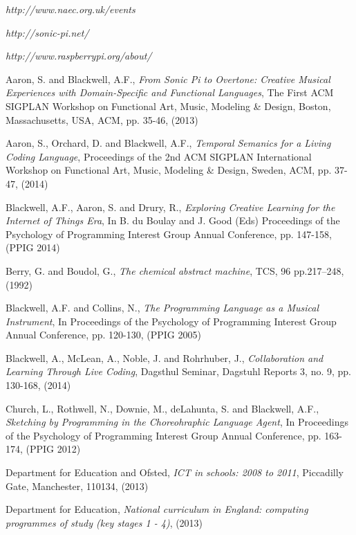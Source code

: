\documentclass[11pt]{scrartcl}
\begin{document}
\begin{thebibliography}{9}

  \emph{http://www.naec.org.uk/events}

  \emph{http://sonic-pi.net/}

  \emph{http://www.raspberrypi.org/about/}

  Aaron, S. and Blackwell, A.F.,
  \emph{From Sonic Pi to Overtone: Creative Musical Experiences with Domain-Specific and Functional Languages},
  The First ACM SIGPLAN Workshop on Functional Art, Music, Modeling \& Design,
  Boston, Massachusetts, USA,
  ACM, pp. 35-46,
  (2013)

  Aaron, S., Orchard, D. and Blackwell, A.F.,
  \emph{Temporal Semanics for a Living Coding Language},
  Proceedings of the 2nd ACM SIGPLAN International Workshop on Functional Art, Music, Modeling \& Design,
  Sweden, ACM, pp. 37-47,
  (2014)

  Blackwell, A.F., Aaron, S. and Drury, R., 
  \emph{Exploring Creative Learning for the Internet of Things Era},
  In B. du Boulay and J. Good (Eds) Proceedings of the Psychology of Programming Interest Group Annual Conference, 
  pp. 147-158,
  (PPIG 2014)

  Berry, G. and Boudol, G.,
  \emph{The chemical abstract machine},
  TCS, 96 pp.217–248, 
  (1992)

  Blackwell, A.F. and Collins, N.,
  \emph{The Programming Language as a Musical Instrument},
  In Proceedings of the Psychology of Programming Interest Group Annual Conference,
  pp. 120-130,
  (PPIG 2005)

  Blackwell, A., McLean, A., Noble, J. and Rohrhuber, J.,
  \emph{Collaboration and Learning Through Live Coding},
  Dagsthul Seminar, Dagstuhl Reports 3,
  no. 9, pp. 130-168,
  (2014)

  Church, L., Rothwell, N., Downie, M., deLahunta, S. and Blackwell, A.F.,
  \emph{Sketching by Programming in the Choreohraphic Language Agent},
  In Proceedings of the Psychology of Programming Interest Group Annual Conference,
  pp. 163-174,
  (PPIG 2012)

  Department for Education and Ofsted,
  \emph{ICT in schools: 2008 to 2011},
  Piccadilly Gate,
  Manchester,
  110134,
  (2013)

  Department for Education,
  \emph{National curriculum in England: computing programmes of study (key stages 1 - 4)},
  (2013)


\end{thebibliography}
\end{document}
